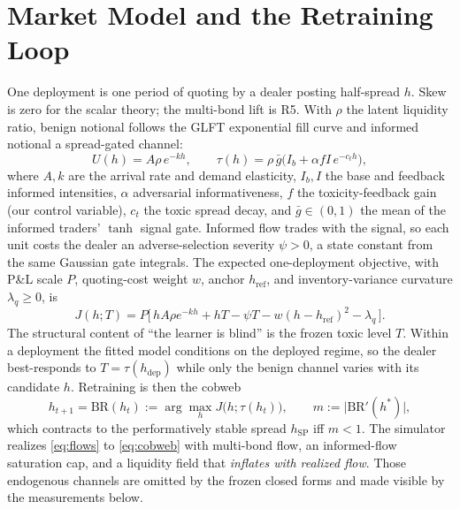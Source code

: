 \documentclass[sigconf]{acmart}
\newcommand{\BR}{\mathrm{BR}}
\newcommand{\hSP}{h_{\mathrm{SP}}}
\newcommand{\hRef}{h_{\mathrm{ref}}}  %
\newcommand{\gbar}{\bar{g}}
\begin{document}
\section{Market Model and the Retraining Loop}
\label{sec:model}

One deployment is one period of quoting by a dealer posting half-spread $h$.
Skew is zero for the scalar theory; the multi-bond lift is R5. With $\rho$
the latent liquidity ratio, benign notional follows the GLFT exponential
fill curve and informed notional a spread-gated channel:
\begin{equation}
U(h)=A\rho\,e^{-kh},\qquad
\tau(h)=\rho\,\gbar\big(I_b+\alpha f I\,e^{-c_t h}\big),
\label{eq:flows}
\end{equation}
where $A,k$ are the arrival rate and demand elasticity, $I_b,I$ the base and
feedback informed intensities, $\alpha$ adversarial informativeness, $f$ the
toxicity-feedback gain (our control variable), $c_t$ the toxic spread decay,
and $\gbar\in(0,1)$ the mean of the informed traders' $\tanh$ signal gate.
Informed flow trades with the signal, so each unit costs the dealer an
adverse-selection severity $\psi>0$, a state constant from the same Gaussian
gate integrals. The expected one-deployment objective, with P\&L scale $P$,
quoting-cost weight $w$, anchor $\hRef$, and inventory-variance curvature
$\lambda_q\ge0$, is
\begin{equation}
J(h;T)=P\big[\,hA\rho e^{-kh}+hT-\psi T-w(h-\hRef)^2-\lambda_q\,\big].
\label{eq:objective}
\end{equation}
The structural content of ``the learner is blind'' is the frozen toxic level
$T$. Within a deployment the fitted model conditions on the deployed regime,
so the dealer best-responds to $T=\tau(h_{\mathrm{dep}})$ while only the
benign channel varies with its candidate $h$. Retraining is then the cobweb
\begin{equation}
h_{t+1}=\BR(h_t):=\arg\max_h J\big(h;\tau(h_t)\big),\qquad
m:=\big|\BR'(h^*)\big|,
\label{eq:cobweb}
\end{equation}
which contracts to the performatively stable spread $\hSP$ iff $m<1$. The
simulator realizes \eqref{eq:flows} to \eqref{eq:cobweb} with multi-bond
flow, an informed-flow saturation cap, and a liquidity field that
\emph{inflates with realized flow}. Those endogenous channels are omitted by
the frozen closed forms and made visible by the measurements below.

\end{document}
